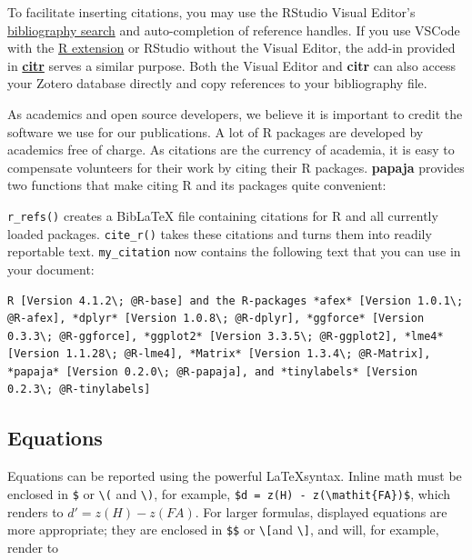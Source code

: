 \documentclass[
  ,man,floatsintext]{apa6}
\begin{document}
To facilitate inserting citations, you may use the RStudio Visual Editor's \href{https://rstudio.github.io/visual-markdown-editing/citations.html\#inserting-citations}{bibliography search} and auto-completion of reference handles.
If you use VSCode with the \href{https://marketplace.visualstudio.com/items?itemName=Ikuyadeu.r}{R extension} or RStudio without the Visual Editor, the add-in provided in \href{https://github.com/crsh/citr}{\textbf{citr}} serves a similar purpose.
Both the Visual Editor and \textbf{citr} can also access your Zotero database directly and copy references to your bibliography file.

As academics and open source developers, we believe it is important to credit the software we use for our publications.
A lot of R packages are developed by academics free of charge.
As citations are the currency of academia, it is easy to compensate volunteers for their work by citing their R packages.
\textbf{papaja} provides two functions that make citing R and its packages quite convenient:

\texttt{r\_refs()} creates a BibLaTeX file containing citations for R and all currently loaded packages.
\texttt{cite\_r()} takes these citations and turns them into readily reportable text.
\texttt{my\_citation} now contains the following text that you can use in your document:

\begin{Verbatim}[breaklines=true]
R [Version 4.1.2\; @R-base] and the R-packages *afex* [Version 1.0.1\; @R-afex], *dplyr* [Version 1.0.8\; @R-dplyr], *ggforce* [Version 0.3.3\; @R-ggforce], *ggplot2* [Version 3.3.5\; @R-ggplot2], *lme4* [Version 1.1.28\; @R-lme4], *Matrix* [Version 1.3.4\; @R-Matrix], *papaja* [Version 0.2.0\; @R-papaja], and *tinylabels* [Version 0.2.3\; @R-tinylabels]
\end{Verbatim}

\hypertarget{equations}{%
\subsection{Equations}\label{equations}}

Equations can be reported using the powerful \LaTeX syntax.
Inline math must be enclosed in \texttt{\$} or \texttt{\textbackslash{}(} and \texttt{\textbackslash{})}, for example, \texttt{\$d\textquotesingle{}\ =\ z(H)\ -\ z(\textbackslash{}mathit\{FA\})\$}, which renders to \(d' = z(H) - z(\mathit{FA})\).
For larger formulas, displayed equations are more appropriate; they are enclosed in \texttt{\$\$} or \texttt{\textbackslash{}{[}}and \texttt{\textbackslash{}{]}}, and will, for example, render to
\end{document}
